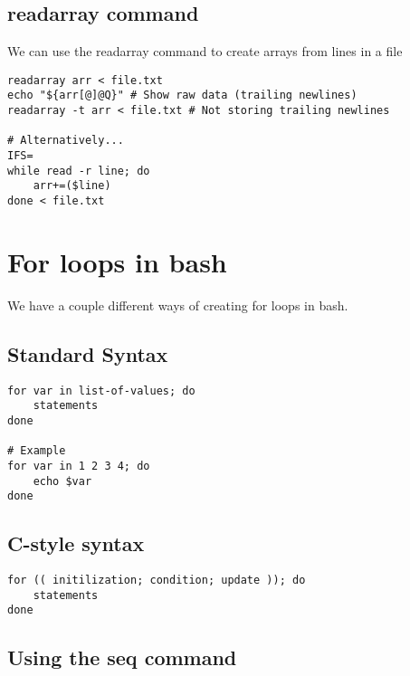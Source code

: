 \documentclass{report}
\begin{document}
    \pagebreak \bigbreak \noindent 
    \subsection{readarray command}
    \bigbreak \noindent 
    We can use the readarray command to create arrays from lines in a file
    
    \begin{verbatim}
readarray arr < file.txt
echo "${arr[@]@Q}" # Show raw data (trailing newlines)
readarray -t arr < file.txt # Not storing trailing newlines

# Alternatively...
IFS=
while read -r line; do
    arr+=($line)
done < file.txt
    \end{verbatim}
    \bigbreak \noindent
    
    
    \pagebreak \bigbreak \noindent 
    \section{\LARGE For loops in bash}
    \bigbreak \noindent 
    We have a couple different ways of creating for loops in bash.
    \bigbreak \noindent 
    \subsection{Standard Syntax}
    \smallbreak \noindent
    
    \begin{verbatim}
for var in list-of-values; do
    statements
done

# Example
for var in 1 2 3 4; do
    echo $var
done
    \end{verbatim}
    \bigbreak \noindent
    

    \bigbreak \noindent 
    \subsection{C-style syntax}
    \smallbreak \noindent
    
    \begin{verbatim}
for (( initilization; condition; update )); do 
    statements
done
    \end{verbatim}
    \bigbreak \noindent
    
    \bigbreak \noindent 
    \subsection{Using the seq command}
    \smallbreak \noindent
    
\end{document}
